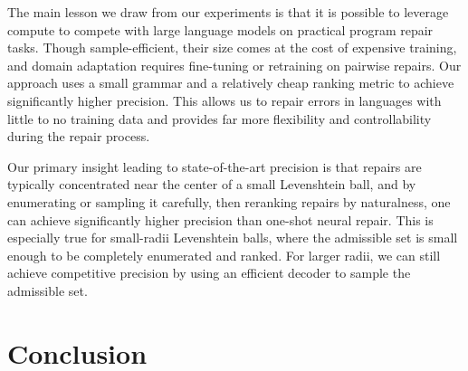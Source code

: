 \documentclass[runningheads]{llncs}
\makeatletter
\def\squigglyred{\bgroup \markoverwith{\textcolor{red}{\lower3\p@\hbox{\sixly \char58}}}\ULon}
\newcommand{\err}[1]{\smash{\squigglyred{#1}{}}}
\makeatother
\begin{document}
%
%

The main lesson we draw from our experiments is that it is possible to leverage compute to compete with large language models on practical program repair tasks. Though sample-efficient, their size comes at the cost of expensive training, and domain adaptation requires fine-tuning or retraining on pairwise repairs. Our approach uses a small grammar and a relatively cheap ranking metric to achieve significantly higher precision. This allows us to repair errors in languages with little to no training data and provides far more flexibility and controllability during the repair process.

Our primary insight leading to state-of-the-art precision is that repairs are typically concentrated near the center of a small Levenshtein ball, and by enumerating or sampling it carefully, then reranking repairs by naturalness, one can achieve significantly higher precision than one-shot neural repair. This is especially true for small-radii Levenshtein balls, where the admissible set is small enough to be completely enumerated and ranked. For larger radii, we can still achieve competitive precision by using an efficient decoder to sample the admissible set.

\section{Conclusion}
\end{document}
